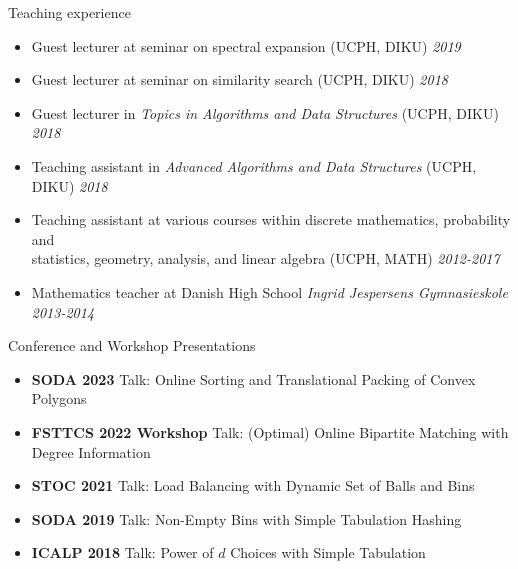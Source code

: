 \documentclass{resume} %
\begin{document}
\newpage
\begin{rSection}{Teaching experience}
 \begin{itemize}
 \item Guest lecturer at seminar on spectral expansion (UCPH, DIKU) \hfill{\emph{2019}}
 \item Guest lecturer at seminar on similarity search (UCPH, DIKU) \hfill{\emph{2018}}
 \item Guest lecturer in \emph{Topics in Algorithms and Data Structures} (UCPH, DIKU) \hfill{\emph{2018}}
 \item Teaching assistant in \emph{Advanced Algorithms and Data Structures} (UCPH, DIKU) \hfill{\emph{2018}}
 \item Teaching assistant at various courses within discrete mathematics, probability and \\ statistics, geometry, analysis, and linear algebra (UCPH, MATH) \hfill{\emph{2012-2017}}
 \item Mathematics teacher at Danish High School \emph{Ingrid Jespersens Gymnasieskole} \hfill{\emph{2013-2014}}
 \end{itemize}
 \end{rSection}
 
 
 
 \begin{rSection}{Conference and Workshop Presentations}
 \begin{itemize}
 \item  \textbf{SODA 2023}  Talk: Online Sorting and Translational Packing of Convex Polygons
 \item \textbf{FSTTCS 2022 Workshop} Talk: (Optimal) Online Bipartite Matching with Degree Information
 \item \textbf{STOC 2021} Talk: Load Balancing with Dynamic Set of Balls and Bins
 \item \textbf{SODA 2019} Talk: Non-Empty Bins with Simple Tabulation Hashing
 \item  \textbf{ICALP 2018} Talk: Power of $d$ Choices with Simple Tabulation
 \end{itemize}
 \end{rSection}
 
\end{document}
